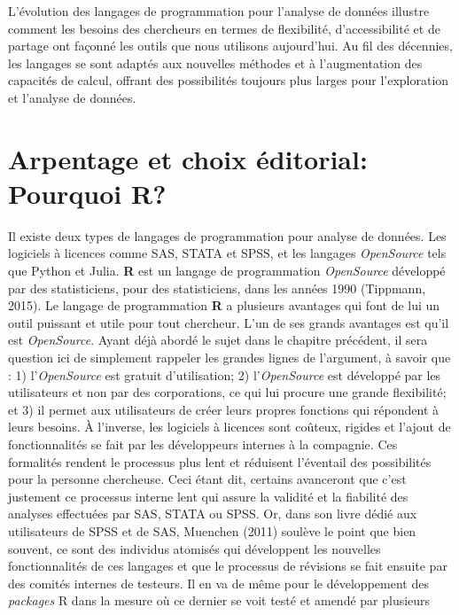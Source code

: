 \documentclass[
  letterpaper,
  DIV=11,
  numbers=noendperiod]{scrreprt}
\begin{document}
L'évolution des langages de programmation pour l'analyse de données
illustre comment les besoins des chercheurs en termes de flexibilité,
d'accessibilité et de partage ont façonné les outils que nous utilisons
aujourd'hui. Au fil des décennies, les langages se sont adaptés aux
nouvelles méthodes et à l'augmentation des capacités de calcul, offrant
des possibilités toujours plus larges pour l'exploration et l'analyse de
données.

\hypertarget{arpentage-et-choix-uxe9ditorial-pourquoi-r}{%
\section{Arpentage et choix éditorial: Pourquoi
R?}\label{arpentage-et-choix-uxe9ditorial-pourquoi-r}}

Il existe deux types de langages de programmation pour analyse de
données. Les logiciels à licences comme SAS, STATA et SPSS, et les
langages \emph{OpenSource} tels que Python et Julia. \textbf{R} est un
langage de programmation \emph{OpenSource} développé par des
statisticiens, pour des statisticiens, dans les années 1990 (Tippmann,
2015). Le langage de programmation \textbf{R} a plusieurs avantages qui
font de lui un outil puissant et utile pour tout chercheur. L'un de ses
grands avantages est qu'il est \emph{OpenSource}. Ayant déjà abordé le
sujet dans le chapitre précédent, il sera question ici de simplement
rappeler les grandes lignes de l'argument, à savoir que : 1)
l'\emph{OpenSource} est gratuit d'utilisation; 2) l'\emph{OpenSource}
est développé par les utilisateurs et non par des corporations, ce qui
lui procure une grande flexibilité; et 3) il permet aux utilisateurs de
créer leurs propres fonctions qui répondent à leurs besoins. À
l'inverse, les logiciels à licences sont coûteux, rigides et l'ajout de
fonctionnalités se fait par les développeurs internes à la compagnie.
Ces formalités rendent le processus plus lent et réduisent l'éventail
des possibilités pour la personne chercheuse. Ceci étant dit, certains
avanceront que c'est justement ce processus interne lent qui assure la
validité et la fiabilité des analyses effectuées par SAS, STATA ou SPSS.
Or, dans son livre dédié aux utilisateurs de SPSS et de SAS, Muenchen
(2011) soulève le point que bien souvent, ce sont des individus atomisés
qui développent les nouvelles fonctionnalités de ces langages et que le
processus de révisions se fait ensuite par des comités internes de
testeurs. Il en va de même pour le développement des \emph{packages} R
dans la mesure où ce dernier se voit testé et amendé par plusieurs
\end{document}
